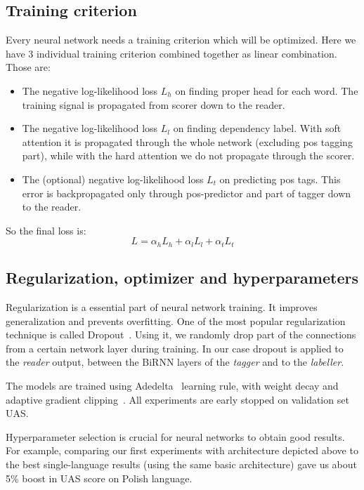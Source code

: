 \subsection{Training criterion}
Every neural network needs a training criterion which will be optimized.
Here we have 3 individual training criterion combined together as linear
combination. Those are:
\begin{itemize}
        \item The negative log-likelihood loss $L_h$ on finding proper head for each
            word. The training signal is propagated from scorer down to the reader.
        \item The negative log-likelihood loss $L_l$ on finding dependency label.
            With soft attention it is propagated through the whole network (excluding
            pos tagging part), while with the hard attention we do not propagate
            through the scorer.
        \item The (optional) negative log-likelihood loss $L_t$ on predicting pos tags.
            This error is backpropagated only through pos-predictor and part of tagger
            down to the reader.
\end{itemize}
So the final loss is:
\begin{equation}\label{eq:neural_loss}
    L = \alpha_hL_h + \alpha_lL_l + \alpha_tL_t
\end{equation}

\subsection{Regularization, optimizer and hyperparameters} \label{sec:basic_params}
Regularization is a essential part of  neural network training. It improves 
generalization and prevents overfitting. One of the most popular regularization
technique is called Dropout~\cite{srivastava_dropout:_2014}. Using it, we randomly
drop part of the connections from a certain network layer during training.
In our case dropout is applied to the \emph{reader} output, between the BiRNN
layers of the \emph{tagger} and to the \emph{labeller}.

The models are trained using Adedelta~\cite{zeiler_adadelta:_2012} learning rule,
with weight decay and adaptive gradient clipping~\cite{chorowski_end--end_2014}.
All experiments are early stopped on validation set UAS.

Hyperparameter selection is crucial for neural networks to obtain good results.
For example, comparing our first experiments with architecture depicted above to
the best single-language results (using the same basic architecture) gave us
about 5\% boost in UAS score on Polish language.

